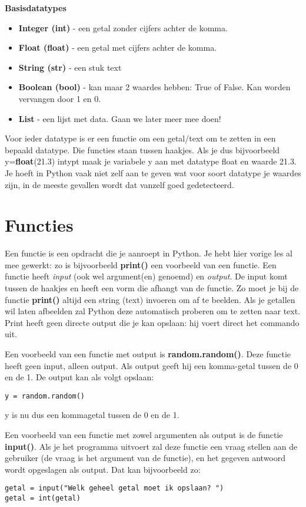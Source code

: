 \textbf{Basisdatatypes}
\begin{itemize}
\item \textbf{Integer (int)} - een getal zonder cijfers achter de komma.
\item \textbf{Float (float)} - een getal met cijfers achter de komma.
\item \textbf{String (str)} - een stuk text
\item \textbf{Boolean (bool)} - kan maar 2 waardes hebben: True of False. Kan worden vervangen door 1 en 0. 
\item \textbf{List} - een lijst met data. Gaan we later meer mee doen!
\end{itemize}

Voor ieder datatype is er een functie om een getal/text om te zetten in een bepaald datatype. Die functies staan tussen haakjes. Als je dus bijvoorbeeld y=\textbf{float}(21.3) intypt maak je variabele y aan met datatype float en waarde 21.3. Je hoeft in Python vaak niet zelf aan te geven wat voor soort datatype je waardes zijn, in de meeste gevallen wordt dat vanzelf goed gedetecteerd.

\section{Functies}

Een functie is een opdracht die je aanroept in Python. Je hebt hier vorige les al mee gewerkt: zo is bijvoorbeeld \textbf{print()} een voorbeeld van een functie. Een functie heeft  \textit{input} (ook wel argument(en) genoemd) en \textit{output}. De input komt tussen de haakjes en heeft een vorm die afhangt van de functie. Zo moet je bij de functie \textbf{print()}  altijd een string (text) invoeren om af te beelden. Als je getallen wil laten afbeelden zal Python deze automatisch proberen om te zetten naar text. Print heeft geen directe output die je kan opslaan: hij voert direct het commando uit.

Een voorbeeld van een functie met output is \textbf{random.random()}. Deze functie heeft geen input, alleen output. Als output geeft hij een komma-getal tussen de 0 en de 1. De output kan als volgt opslaan:
\begin{lstlisting}[frame=single]
y = random.random() 
\end{lstlisting}
y is nu dus een kommagetal tussen de 0 en de 1. 

Een voorbeeld van een functie met zowel argumenten als output is de functie \textbf{input()}. Als je het programma uitvoert zal deze functie een vraag stellen aan de gebruiker (de vraag is het argument van de functie), en het gegeven antwoord wordt opgeslagen als output. Dat kan bijvoorbeeld zo:
\begin{lstlisting}[frame=single]
getal = input("Welk geheel getal moet ik opslaan? ")
getal = int(getal)
\end{lstlisting}

